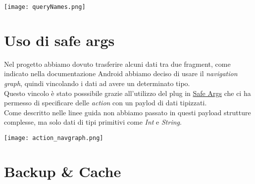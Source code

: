 \documentclass[../Assignment-3-LPSMT.tex]{subfiles}
\begin{document}
\begin{center}
  \texttt{[image: queryNames.png]}
\end{center}

\section{Uso di safe args}

Nel progetto abbiamo dovuto trasferire alcuni dati tra due fragment, come indicato nella documentazione Android abbiamo deciso di usare il \emph{navigation graph}, quindi vincolando i dati ad avere un determinato tipo.\\
Questo vincolo è stato posssibile grazie all'utilizzo del plug in \href{https://developer.android.com/guide/navigation/use-graph/pass-data#Safe-args}{Safe Args} che ci ha permesso di specificare delle \emph{action} con un paylod di dati tipizzati.\\
Come descritto nelle linee guida non abbiamo passato in questi payload strutture complesse, ma solo dati di tipi primitivi come \emph{Int} e \emph{String}.

\begin{center}
  \texttt{[image: action\_navgraph.png]}
\end{center}

\section{Backup \& Cache}
\end{document}
